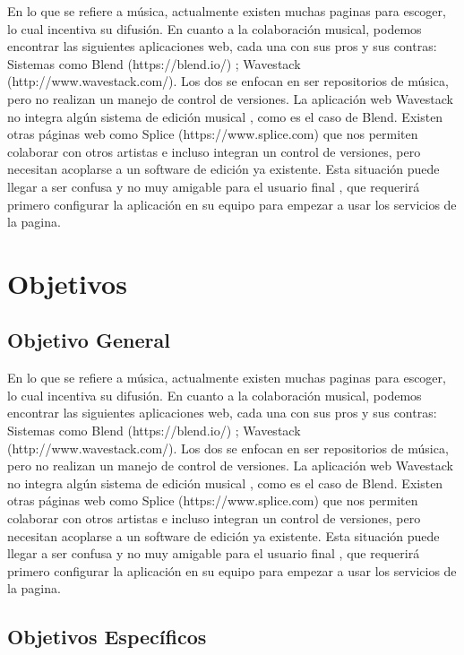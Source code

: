En lo que se refiere a música, actualmente existen muchas paginas para escoger,
lo cual incentiva su difusión.  En cuanto a la colaboración musical, podemos
encontrar las siguientes aplicaciones web, cada una con sus pros y sus contras:
Sistemas como Blend (https://blend.io/) ; Wavestack
(http://www.wavestack.com/). Los dos se enfocan en ser repositorios de música,
pero no realizan un manejo de control de versiones. La aplicación web Wavestack
no integra algún sistema de edición musical , como es el caso de Blend.
Existen otras páginas web como Splice (https://www.splice.com) que nos permiten
colaborar con otros artistas e incluso integran un control de versiones, pero
necesitan acoplarse a un software de edición ya existente. Esta situación puede
llegar a ser confusa y no muy amigable para el usuario final , que requerirá
primero configurar la aplicación en su equipo para empezar a usar los servicios
de la pagina.

\section{Objetivos}

\subsection{Objetivo General}

En lo que se refiere a música, actualmente existen muchas paginas para escoger,
lo cual incentiva su difusión.  En cuanto a la colaboración musical, podemos
encontrar las siguientes aplicaciones web, cada una con sus pros y sus contras:
Sistemas como Blend (https://blend.io/) ; Wavestack
(http://www.wavestack.com/). Los dos se enfocan en ser repositorios de música,
pero no realizan un manejo de control de versiones. La aplicación web Wavestack
no integra algún sistema de edición musical , como es el caso de Blend.
Existen otras páginas web como Splice (https://www.splice.com) que nos permiten
colaborar con otros artistas e incluso integran un control de versiones, pero
necesitan acoplarse a un software de edición ya existente. Esta situación puede
llegar a ser confusa y no muy amigable para el usuario final , que requerirá
primero configurar la aplicación en su equipo para empezar a usar los servicios
de la pagina.

\subsection{Objetivos Específicos}

